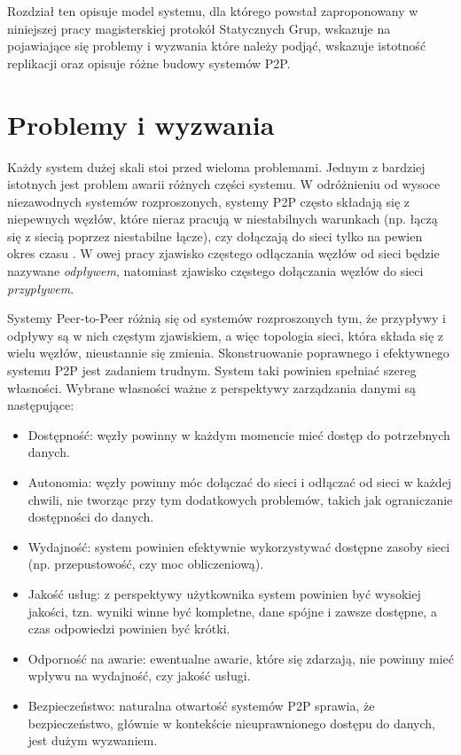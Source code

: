 \documentclass[12pt, twoside, openany]{report}
\begin{document}
Rozdział ten opisuje model systemu, dla którego powstał zaproponowany w niniejszej pracy magisterskiej protokół Statycznych Grup, wskazuje na pojawiające się problemy i wyzwania które należy podjąć, wskazuje istotność replikacji oraz opisuje różne budowy systemów P2P.

\section{Problemy i wyzwania}

Każdy system dużej skali stoi przed wieloma problemami. Jednym z bardziej istotnych jest problem awarii różnych części systemu. W odróżnieniu od wysoce niezawodnych systemów rozproszonych, systemy P2P często składają się z niepewnych węzłów, które nieraz pracują w niestabilnych warunkach (np. łączą się z siecią poprzez niestabilne łącze), czy dołączają do sieci tylko na pewien okres czasu \cite{bib:paiva}. W owej pracy zjawisko częstego odłączania węzłów od sieci będzie nazywane \textit{odpływem}, natomiast zjawisko częstego dołączania węzłów do sieci \textit{przypływem}.

Systemy Peer-to-Peer różnią się od systemów rozproszonych tym, że przypływy i odpływy są w nich częstym zjawiskiem, a więc topologia sieci, która składa się z wielu węzłów, nieustannie się zmienia. Skonstruowanie poprawnego i efektywnego systemu P2P jest zadaniem trudnym. System taki powinien spełniać szereg własności. Wybrane własności ważne z perspektywy zarządzania danymi \cite{bib:martins} są następujące:
\begin{itemize}
\item Dostępność: węzły powinny w każdym momencie mieć dostęp do potrzebnych danych.
\item Autonomia: węzły powinny móc dołączać do sieci i odłączać od sieci w każdej chwili, nie tworząc przy tym dodatkowych problemów, takich jak ograniczanie dostępności do danych.
\item Wydajność: system powinien efektywnie wykorzystywać dostępne zasoby sieci (np. przepustowość, czy moc obliczeniową).
\item Jakość usług: z perspektywy użytkownika system powinien być wysokiej jakości, tzn. wyniki winne być kompletne, dane spójne i zawsze dostępne, a czas odpowiedzi powinien być krótki.
\item Odporność na awarie: ewentualne awarie, które się zdarzają, nie powinny mieć wpływu na wydajność, czy jakość usługi.
\item Bezpieczeństwo: naturalna otwartość systemów P2P sprawia, że bezpieczeństwo, głównie w kontekście nieuprawnionego dostępu do danych, jest dużym wyzwaniem.
\end{itemize}
\end{document}
